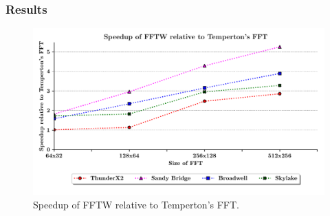\documentclass[a4paper,11pt]{report}
\begin{document}
\subsubsection{Results}

\begin{figure}[htbp]
    \centering
    \includegraphics[width=1\textwidth]{img/speedup-fft.pdf}
    \caption[Speedup of FFTW relative to Temperton's FFT]{Speedup of FFTW relative to Temperton's FFT. }
    \label{fig:fft-speedup}
\end{figure}
\end{document}
